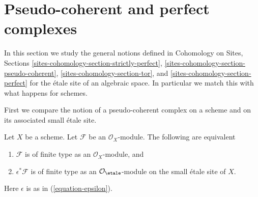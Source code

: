 \section{Pseudo-coherent and perfect complexes}
\label{section-spell-out}

\noindent
In this section we study the general notions defined in
Cohomology on Sites, Sections
\ref{sites-cohomology-section-strictly-perfect},
\ref{sites-cohomology-section-pseudo-coherent},
\ref{sites-cohomology-section-tor}, and
\ref{sites-cohomology-section-perfect}
for the \'etale site of an algebraic space. In particular we
match this with what happens for schemes.

\medskip\noindent
First we compare the notion of a pseudo-coherent complex on a
scheme and on its associated small \'etale site.

\begin{lemma}
\label{lemma-descend-finite-type}
Let $X$ be a scheme. Let $\mathcal{F}$ be an $\mathcal{O}_X$-module.
The following are equivalent
\begin{enumerate}
\item $\mathcal{F}$ is of finite type as an $\mathcal{O}_X$-module, and
\item $\epsilon^*\mathcal{F}$ is of finite type as an
$\mathcal{O}_\etale$-module on the small \'etale site of $X$.
\end{enumerate}
Here $\epsilon$ is as in (\ref{equation-epsilon}).
\end{lemma}

